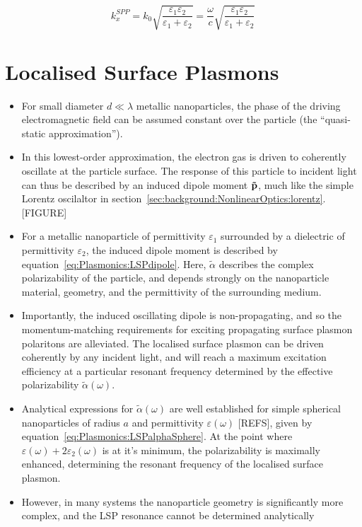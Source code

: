 \begin{equation}\label{eq:Plasmonics:SPPdispersion}
    k^{SPP}_{x} = k_0 \sqrt{\frac{\varepsilon_{1}\varepsilon_{2}}{\varepsilon_{1}+\varepsilon_{2}}} = \frac{\omega}{c} \sqrt{\frac{\varepsilon_{1}\varepsilon_{2}}{\varepsilon_{1}+\varepsilon_{2}}}
\end{equation}


\section{Localised Surface Plasmons}\label{sec:background:Plasmonics:Metamaterials}
\begin{itemize}
    \item For small diameter $d \ll \lambda$ metallic nanoparticles, the phase of the driving electromagnetic field can be assumed constant over the particle (the ``quasi-static approximation'').
    \item In this lowest-order approximation, the electron gas is driven to coherently oscillate at the particle surface. The response of this particle to incident light can thus be described by an induced dipole moment $\bf{\tilde p}$, much like the simple Lorentz oscilaltor in section~\ref{sec:background:NonlinearOptics:lorentz}. [FIGURE]
    \item For a metallic nanoparticle of permittivity $\varepsilon_1$ surrounded by a dielectric of permittivity $\varepsilon_2$, the induced dipole moment is described by equation~\ref{eq:Plasmonics:LSPdipole}. Here, ${\tilde \alpha }$ describes the complex polarizability of the particle, and depends strongly on the nanoparticle material, geometry, and the permittivity of the surrounding medium.
    \item Importantly, the induced oscillating dipole is non-propagating, and so the momentum-matching requirements for exciting propagating surface plasmon polaritons are alleviated. The localised surface plasmon can be driven coherently by any incident light, and will reach a maximum excitation efficiency at a particular resonant frequency determined by the effective polarizability ${\tilde \alpha }(\omega)$.
    \item Analytical expressions for ${\tilde \alpha }(\omega)$ are well established for simple spherical nanoparticles of radius $a$ and permittivity $\varepsilon(\omega)$ [REFS], given by equation~\ref{eq:Plasmonics:LSPalphaSphere}. At the point where $\varepsilon (\omega) + 2\varepsilon_2 (\omega)$ is at it's minimum, the polarizability is maximally enhanced, determining the resonant frequency of the localised surface plasmon.
    \item However, in many systems the nanoparticle geometry is significantly more complex, and the LSP resonance cannot be determined analytically
\end{itemize}

